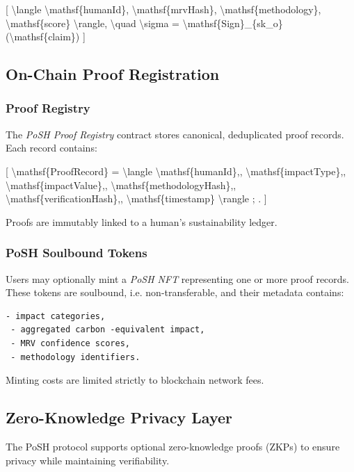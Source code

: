 \documentclass{article}
\begin{document}
[
{\textbackslash}langle {\textbackslash}mathsf\{humanId\}, {\textbackslash}mathsf\{mrvHash\}, {\textbackslash}mathsf\{methodology\}, {\textbackslash}mathsf\{score\} {\textbackslash}rangle, {\textbackslash}quad {\textbackslash}sigma = {\textbackslash}mathsf\{Sign\}\_\{sk\_o\}({\textbackslash}mathsf\{claim\})
]

\subsection{On-Chain Proof Registration}

\subsubsection{Proof Registry}

The \textit{PoSH Proof Registry} contract stores canonical, deduplicated proof
records. Each record contains:

[
{\textbackslash}mathsf\{ProofRecord\} =
{\textbackslash}langle
{\textbackslash}mathsf\{humanId\},,
{\textbackslash}mathsf\{impactType\},,
{\textbackslash}mathsf\{impactValue\},,
{\textbackslash}mathsf\{methodologyHash\},,
{\textbackslash}mathsf\{verificationHash\},,
{\textbackslash}mathsf\{timestamp\}
{\textbackslash}rangle ; .
]

Proofs are immutably linked to a human's sustainability ledger.

\subsubsection{PoSH Soulbound Tokens}

Users may optionally mint a \textit{PoSH NFT} representing one or more proof
records. These tokens are soulbound, i.e. non-transferable, and their metadata
contains:

\begin{verbatim}
- impact categories,
 - aggregated carbon -equivalent impact,
 - MRV confidence scores,
 - methodology identifiers.
\end{verbatim}

Minting costs are limited strictly to blockchain network fees.

\subsection{Zero-Knowledge Privacy Layer}

The PoSH protocol supports optional zero-knowledge proofs (ZKPs) to ensure
privacy while maintaining verifiability.
\end{document}
